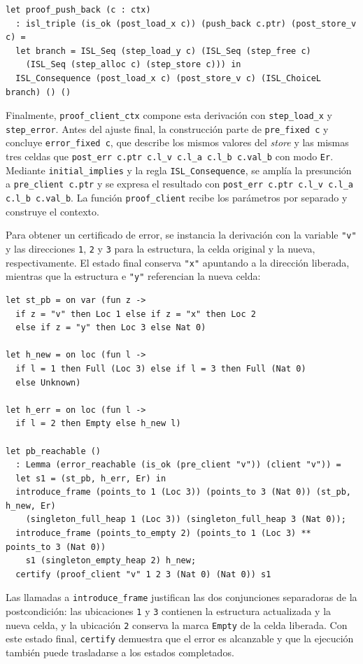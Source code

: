 \documentclass[a4paper,	11pt]{report}
\begin{document}
\begin{lstlisting}
let proof_push_back (c : ctx)
  : isl_triple (is_ok (post_load_x c)) (push_back c.ptr) (post_store_v c) =
  let branch = ISL_Seq (step_load_y c) (ISL_Seq (step_free c)
    (ISL_Seq (step_alloc c) (step_store c))) in
  ISL_Consequence (post_load_x c) (post_store_v c) (ISL_ChoiceL branch) () ()
\end{lstlisting}

Finalmente,
\lstinline|proof_client_ctx| compone esta derivación con \lstinline|step_load_x| y \lstinline|step_error|.
Antes del ajuste final,
la construcción parte de \lstinline|pre_fixed c| y concluye \lstinline|error_fixed c|,
que describe los mismos valores del \emph{store} y las mismas tres celdas que \lstinline|post_err c.ptr c.l_v c.l_a c.l_b c.val_b| con modo \lstinline|Er|.
Mediante \lstinline|initial_implies| y la regla \lstinline|ISL_Consequence|,
se amplía la presunción a \lstinline|pre_client c.ptr| y se expresa el resultado con \lstinline|post_err c.ptr c.l_v c.l_a c.l_b c.val_b|.
La función \lstinline|proof_client| recibe los parámetros por separado y construye el contexto.

Para obtener un certificado de error,
se instancia la derivación con la variable \lstinline|"v"| y las direcciones \lstinline|1|,
\lstinline|2| y \lstinline|3| para la estructura,
la celda original y la nueva,
respectivamente.
El estado final conserva \lstinline|"x"| apuntando a la dirección liberada,
mientras que la estructura e \lstinline|"y"| referencian la nueva celda:

\begin{lstlisting}
let st_pb = on var (fun z ->
  if z = "v" then Loc 1 else if z = "x" then Loc 2
  else if z = "y" then Loc 3 else Nat 0)

let h_new = on loc (fun l ->
  if l = 1 then Full (Loc 3) else if l = 3 then Full (Nat 0)
  else Unknown)

let h_err = on loc (fun l ->
  if l = 2 then Empty else h_new l)

let pb_reachable ()
  : Lemma (error_reachable (is_ok (pre_client "v")) (client "v")) =
  let s1 = (st_pb, h_err, Er) in
  introduce_frame (points_to 1 (Loc 3)) (points_to 3 (Nat 0)) (st_pb, h_new, Er)
    (singleton_full_heap 1 (Loc 3)) (singleton_full_heap 3 (Nat 0));
  introduce_frame (points_to_empty 2) (points_to 1 (Loc 3) ** points_to 3 (Nat 0))
    s1 (singleton_empty_heap 2) h_new;
  certify (proof_client "v" 1 2 3 (Nat 0) (Nat 0)) s1
\end{lstlisting}
Las llamadas a \lstinline|introduce_frame| justifican las dos conjunciones separadoras de la postcondición:
las ubicaciones \lstinline|1| y \lstinline|3| contienen la estructura actualizada y la nueva celda,
y la ubicación \lstinline|2| conserva la marca \lstinline|Empty| de la celda liberada.
Con este estado final,
\lstinline|certify| demuestra que el error es alcanzable y que la ejecución también puede trasladarse a los estados completados.
\end{document}
